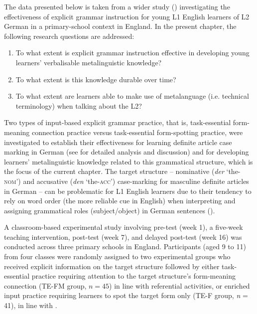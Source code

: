 \documentclass[output=paper]{langscibook}
\begin{document}
The data presented below is taken from a wider study (\citealt{Hanan2015,KasprowiczMarsden2018}) investigating the effectiveness of explicit grammar instruction for young L1 English learners of L2 German in a primary-school context in England. In the present chapter, the following research questions are addressed:

\begin{enumerate}\sloppy
\item To what extent is explicit grammar instruction effective in developing young learners’ verbalisable metalinguistic knowledge?
\item  To what extent is this knowledge durable over time?
\item To what extent are learners able to make use of metalanguage (i.e. technical terminology) when talking about the L2?
\end{enumerate}

Two types of input-based explicit grammar practice, that is, task-essential form-meaning connection practice versus task-essential form-spotting practice, were investigated to establish their effectiveness for learning definite article case marking in German (see \citealt{KasprowiczMarsden2018} for detailed analysis and discussion) and for developing learners’ metalinguistic knowledge related to this grammatical structure, which is the focus of the current chapter. The target structure -- nominative (\textit{der} `the-\textsc{nom}') and accusative (\textit{den} `the-\textsc{acc}') case-marking for masculine definite articles in German -- can be problematic for L1 English learners due to their tendency to rely on word order (the more reliable cue in English) when interpreting and assigning grammatical roles (subject/object) in German sentences (\citealt{CulmanEtAl2009,Jackson2007,VanPattenBorst2012}).

A classroom-based experimental study involving pre-test (week 1), a five-week teaching intervention, post-test (week 7), and delayed post-test (week 16) was conducted across three primary schools in England. Participants (aged 9 to 11) from four classes were randomly assigned to two experimental groups who received explicit information on the target structure followed by either task-es\-sen\-tial practice requiring attention to the target structure’s form-meaning connection (TE-FM group, $n = 45$) in line with  referential activities, or enriched input practice requiring learners to spot the target form only (TE-F group, \textit{n} = 41), in line with \citet{ReindersEllis2009}.
\end{document}
